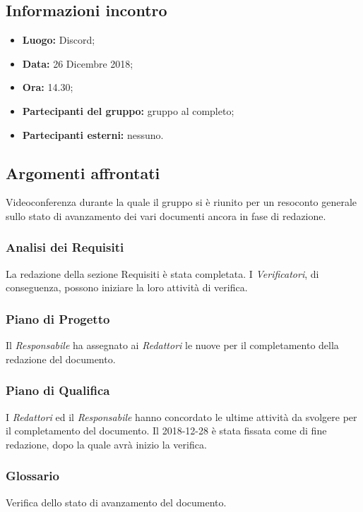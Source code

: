 \subsection{Informazioni incontro}
\begin{itemize}
	\item { \textbf{Luogo:} Discord;  }
	\item { \textbf{Data:} 26 Dicembre 2018; }
	\item { \textbf{Ora:} 14.30; }
	\item { \textbf{Partecipanti del gruppo:} gruppo al completo; }
	\item { \textbf{Partecipanti esterni:} nessuno. }
\end{itemize}


\subsection{Argomenti affrontati}
Videoconferenza durante la quale il gruppo si è riunito per un resoconto generale sullo stato di avanzamento dei vari documenti ancora in fase di redazione.

\subsubsection{Analisi dei Requisiti}
La redazione della sezione Requisiti è stata completata. I \emph{Verificatori}, di conseguenza, possono iniziare la loro attività di verifica.  

\subsubsection{Piano di Progetto}
Il \emph{Responsabile} ha assegnato ai \emph{Redattori} le nuove  per il completamento della redazione del documento.

\subsubsection{Piano di Qualifica}
I \emph{Redattori} ed il \emph{Responsabile} hanno concordato le ultime attività da svolgere per il completamento del documento. Il 2018-12-28 è stata fissata come  di fine redazione, dopo la quale avrà inizio la verifica.

\subsubsection{Glossario}
Verifica dello stato di avanzamento del documento.
